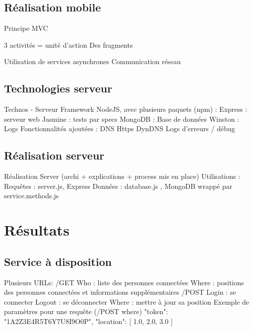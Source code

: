 \documentclass{beamer} %
\begin{document}
  \subsection{Réalisation mobile}
  \begin{frame}{\subsecname}
    Principe MVC

    3 activités
    = unité d’action
    Des fragments

    Utilisation de services asynchrones
    Communication réseau
  \end{frame}

  \subsection{Technologies serveur}
  \begin{frame}{\subsecname}
    Technos - Serveur
    Framework NodeJS, avec plusieurs paquets (npm) :
    Express : serveur web
    Jasmine : tests par specs
    MongoDB : Base de données
    Winston : Logs
    Fonctionnalités ajoutées :
    DNS
    Https
    DynDNS
    Logs d’erreurs / débug
  \end{frame}

  \subsection{Réalisation serveur}
  \begin{frame}{\subsecname}
    Réalisation Server (archi + explications + process mis en place)
    Utilisations :
    Requêtes : server.js, Express
    Données : database.js , MongoDB wrappé par service.methods.js
  \end{frame}

  \section{Résultats}
  \subsection{Service à disposition}
  \begin{frame}{\subsecname}
    Plusieurs URLs:
    /GET
    Who : liste des personnes connectées
    Where : positions des personnes connectées et informations supplémentaires
    /POST
    Login : se connecter
    Logout : se déconnecter
    Where : mettre à jour sa position
    Exemple de paramètres pour une requête (/POST where){
        "token": "1A2Z3E4R5T6Y7U8I9O0P",
        "location": [
            1.0,
            2.0,
            3.0
        ]
    }  
  \end{frame}
\end{document}
